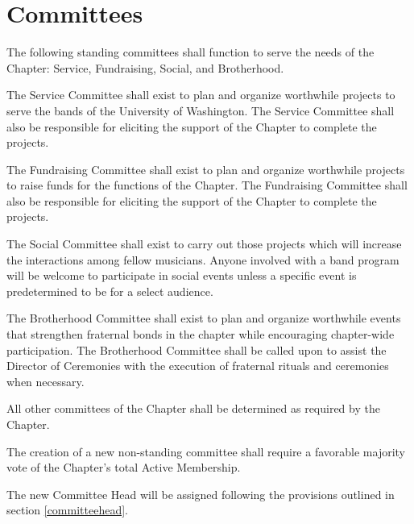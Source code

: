 \documentclass[11pt]{article}
\begin{document}
\section{Committees}
\begin{legal}
  \item
    The following standing committees shall function to serve the needs of the Chapter: Service, Fundraising, Social, and Brotherhood.
    \begin{legal}
      \item 
        The Service Committee shall exist to plan and organize worthwhile projects to serve the bands of the University of Washington.
        The Service Committee shall also be responsible for eliciting the support of the Chapter to complete the projects.
      \item 
        The Fundraising Committee shall exist to plan and organize worthwhile projects to raise funds for the functions of the Chapter.
        The Fundraising Committee shall also be responsible for eliciting the support of the Chapter to complete the projects.
      \item 
        The Social Committee shall exist to carry out those projects which will increase the interactions among fellow musicians.
        Anyone involved with a band program will be welcome to participate in social events unless a specific event is predetermined to be for a select audience.
      \item 
        The Brotherhood Committee shall exist to plan and organize worthwhile events that strengthen fraternal bonds in the chapter while encouraging chapter-wide participation.
        The Brotherhood Committee shall be called upon to assist the Director of Ceremonies with the execution of fraternal rituals and ceremonies when necessary. 
      \item 
        All other committees of the Chapter shall be determined as required by the Chapter.
        \begin{legal}
          \item 
            The creation of a new non-standing committee shall require a favorable majority vote of the Chapter’s total Active Membership.
          \item 
            The new Committee Head will be assigned following the provisions outlined in section \ref{committeehead}.
        \end{legal}
    \end{legal}
  \item
    \label{committeehead}

\end{legal}
\end{document}
